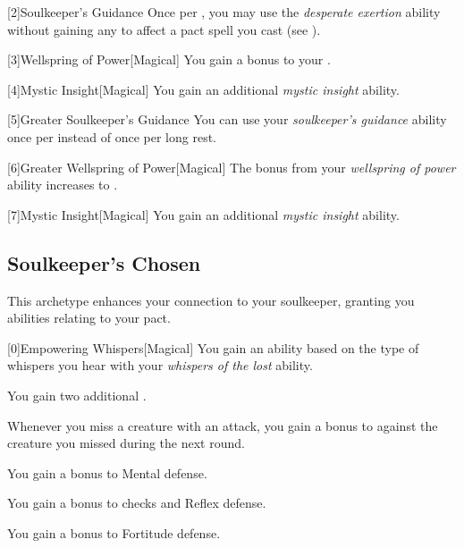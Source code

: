         [2]{Soulkeeper's Guidance} Once per , you may use the \textit{desperate exertion} ability without gaining any  to affect a pact spell you cast (see ).

        [3]{Wellspring of Power}[Magical]
        You gain a  bonus to your  .

        [4]{Mystic Insight}[Magical]
        You gain an additional \textit{mystic insight} ability.

        [5]{Greater Soulkeeper's Guidance} You can use your \textit{soulkeeper's guidance} ability once per  instead of once per long rest.

        [6]{Greater Wellspring of Power}[Magical]
        The bonus from your \textit{wellspring of power} ability increases to .

        [7]{Mystic Insight}[Magical]
        You gain an additional \textit{mystic insight} ability.

    \newpage
    \subsection{Soulkeeper's Chosen}
        This archetype enhances your connection to your soulkeeper, granting you abilities relating to your pact.

        [0]{Empowering Whispers}[Magical]
        You gain an ability based on the type of whispers you hear with your \textit{whispers of the lost} ability.
        {
             You gain two additional .

             Whenever you miss a creature with an attack, you gain a  bonus to  against the creature you missed during the next round.

             You gain a  bonus to Mental defense.

             You gain a  bonus to  checks and Reflex defense.

             You gain a  bonus to Fortitude defense.
        }

